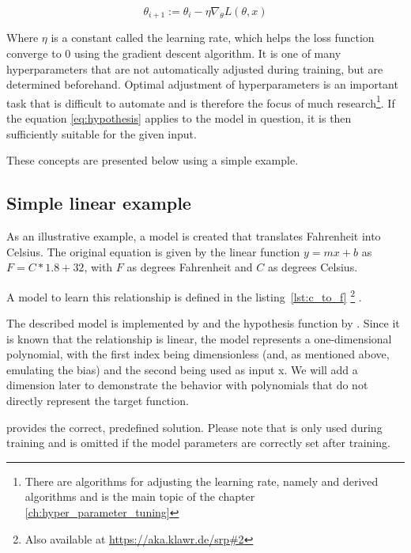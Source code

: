 \begin{equation}
    \theta_{i+1} := \theta_i - \eta \nabla_\theta L(\theta, x)
    \label{eq:gradient_descent}
\end{equation}

Where $\eta$ is a constant called the learning rate, which helps the loss function converge to 0 using the gradient descent algorithm.
It is one of many hyperparameters that are not automatically adjusted during training, but are determined beforehand.
Optimal adjustment of hyperparameters is an important task that is difficult to automate and is therefore the focus of much research\footnote{There are algorithms for adjusting the learning rate, namely  \cite{Duchi2010} and derived algorithms and is the main topic of the chapter \ref{ch:hyper_parameter_tuning}}.
If the equation \eqref{eq:hypothesis} applies to the model in question, it is then sufficiently suitable for the given input.

These concepts are presented below using a simple example.

\subsection{Simple linear example} \label{ch:simple_linear_example}

As an illustrative example, a model is created that translates Fahrenheit into Celsius.
The original equation is given by the linear function $y = mx + b$ as $F = C * 1.8 + 32$, with $F$ as degrees Fahrenheit and $C$ as degrees Celsius.

A model to learn this relationship is defined in the listing~\ref{lst:c_to_f} \footnote{Also available at \url{https://aka.klawr.de/srp\#2}} .



The described model is implemented by  and the hypothesis function by .
Since it is known that the relationship is linear, the model represents a one-dimensional polynomial, with the first index being dimensionless (and, as mentioned above, emulating the bias) and the second being used as input x.
We will add a dimension later to demonstrate the behavior with polynomials that do not directly represent the target function.

 provides the correct, predefined solution.
Please note that  is only used during training and is omitted if the model parameters are correctly set after training.

